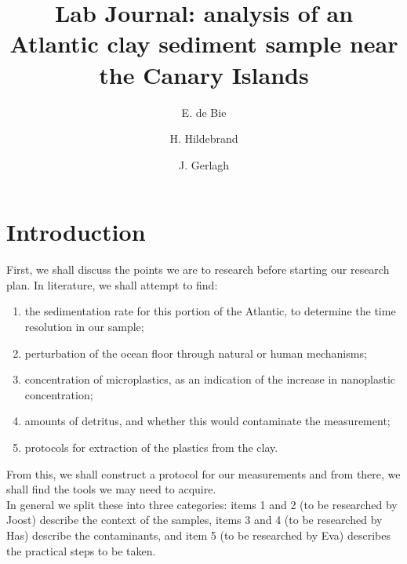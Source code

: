 \documentclass[twocolumn,a4paper,aps,amsmath,amssymb,floatfix,superscriptaddress]{revtex4-2}
\begin{document}
	
	\title{Lab Journal: analysis of an Atlantic clay sediment sample near the Canary Islands}
	\author{E. de Bie}
	
	\author{H. Hildebrand}
	
	\author{J. Gerlagh}
	\maketitle
	
	\section{Introduction}
	First, we shall discuss the points we are to research before starting our research plan. 
	In literature, we shall attempt to find:
	\begin{enumerate}
		\item the sedimentation rate for this portion of the Atlantic, to determine the time resolution in our sample;
		\item perturbation of the ocean floor through natural or human mechanisms;
		\item concentration of microplastics, as an indication of the increase in nanoplastic concentration;
		\item amounts of detritus, and whether this would contaminate the measurement;
		\item protocols for extraction of the plastics from the clay.
	\end{enumerate}
	From this, we shall construct a protocol for our measurements and from there, we shall find the tools we may need to acquire.\\
	In general we split these into three categories: items 1 and 2 (to be researched by Joost) describe the context of the samples, items 3 and 4 (to be researched by Has) describe the contaminants, and item 5 (to be researched by Eva) describes the practical steps to be taken.
	
\end{document}
